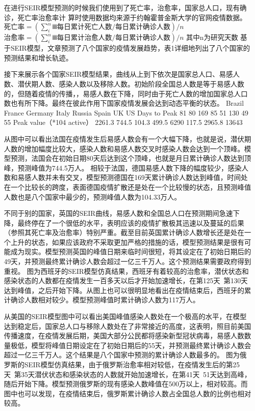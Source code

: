 \documentclass[lang=cn,11pt,a4paper,cite=authoryear]{elegantpaper}
\begin{document}
在进行SEIR模型预测的时候我们使用到了死亡率，治愈率，国家总人口，现有确诊，死亡率治愈率计
算时使用数据均来源于约翰霍普金斯大学的官网疫情数据。
$死亡率=(∑_i^n▒每日累计死亡人数/每日累计确诊人数)/n$
$治愈率=(∑_i^n▒每日累计治愈人数/每日累计确诊人数)/n$
其中n为研究天数
基于SEIR模型，文章预测了八个国家的疫情发展趋势，表1详细地列出了八个国家的预测结果和增长轨迹。

接下来展示各个国家SEIR模型结果，曲线从上到下依次是国家总人口、易感人数、潜伏期人数、感染人数以及移除人数。初始阶段全国总人数是等于易感人数的，但随着疫情的传播，，易感人数在下降，同时由于死亡人数的增加国家总人口数也有所下降。最终在彼此作用下国家疫情发展会达到动态平衡的状态。
	Brazil	France	Germany	Italy	Russia	Spain	UK	US
Days to Peak	81	80	169	85	51	130	49	55
Peak value（*104 active）	2261.3	744.5	104.3	499.5	6290	117.5	2965.8	13643

从图中可以看出法国在疫情发生后易感人数会有一个大幅下降，也就是说，潜伏期人数的增加幅度比较大，感染人数和易感人数交叉时感染人数会达到一个顶峰。模型预测，法国会在初始日期80天后达到这个顶峰，也就是月日累计确诊人数达到顶峰，预测峰值为744.5万人。
相较于法国，德国易感人数下降的幅度较少，感染人数和易感人数并未有交叉，模型预测德国在169天累计确诊人数达到峰值，时间处在一个比较长的跨度，表面德国疫情扩散还是处在一个比较慢的状态，且预测峰值人数也是八个国家中最少的，预测峰值人数为104.33万人。

不同于别的国家，英国的SEIR曲线，易感人数和全国总人口在预测期间急速下降，最终停在了一个很低的水平，表明应该的疫情扩散极其迅速以及蔓延的后果（参照其死亡率及治愈率）特别严重。截至目前英国累计确诊人数增长还是处在一个上升的状态，如果应该政府不采取更加严格的措施的话，模型预测结果是很有可能成为现实。模型预测英国的峰值日期来临时间很短，将其设定在了初始日期后的49天，并预测最终累计确诊人数会超过一亿三千万人。这个预测结果需要政府得到重视。
图为西班牙的SEIR模型仿真结果，西班牙有着较高的治愈率，潜伏状态和感染状态的人数都在疫情发生一百多天以后才开始加速增长，在第125天~第130天达到峰值，之后开始下降。从图上也可以很明显地看出在疫情结束后，西班牙的累计确诊人数相对较少。模型预测峰值时累计确诊人数为117万人。

从美国的SEIR模型图中可以看出美国峰值感染人数处在一个极高的水平，在模型达到稳定后，国家总人口与移除人数处在了非常接近的高度，这表明，照目前美国传播速度，在疫情发展后期，美国大部分公民都将感染新型冠状病毒，易感人数数量极低，模型将峰值日期设定在了初始日期后的55天，并预测最终累计确诊人数会超过一亿三千万人。这个结果是八个国家中预测的累计确诊人数最多的。
图为俄罗斯的SEIR模型仿真结果，由于俄罗斯治愈率相对较低，在疫情发生后的第25天~第35天潜伏状态和感染状态的人数就开始加速增长，在第41天~51天达到高峰，随后开始下降。模型预测俄罗斯的现有感染人数峰值在500万以上，相对较高。而图中也可以发现，在疫情结束后，俄罗斯累计确诊人数占全国总人数的比例也相对较高。
\end{document}
